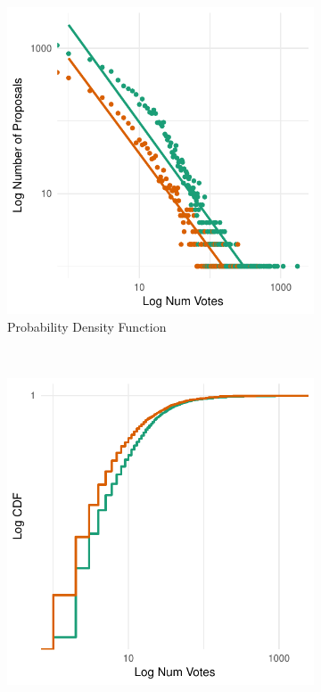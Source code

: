 \begin{figure}[H]
    \centering
    \begin{subfigure}{0.5\textwidth}
        \centering
        \includegraphics[width=1\textwidth]{Figures/votes_1.pdf}
        \caption{Probability Density Function}
    \end{subfigure}%
    ~ 
    \begin{subfigure}{0.5\textwidth}
        \centering        
        \includegraphics[width=1\textwidth]{Figures/votes_2.pdf}

\end{subfigure}
\end{figure}
